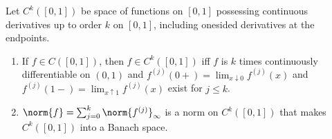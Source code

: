 \documentclass[article, a4paper, 11pt, oneside]{memoir}
\numberwithin{equation}{chapter}
\theoremstyle{nonumberplain}
\begin{document}
\begin{exerciseframed*}[9]
	Let $C^k([0,1])$ be space of functions on $[0,1]$ possessing continuous derivatives up to order $k$ on $[0,1]$, including onesided derivatives at the endpoints.
	\begin{enumerate}
		\item If $f \in C([0,1])$, then $f \in C^k([0,1])$ iff $f$ is $k$ times continuously differentiable on $(0,1)$ and $f^{(j)}(0+) = \lim_{x \downarrow 0} f^{(j)}(x)$ and $f^{(j)}(1-) = \lim_{x \uparrow 1} f^{(j)}(x)$ exist for $j \leq k$.
		\item $\norm{f} = \sum_{j=0}^k \norm{f^{(j)}}_\infty$ is a norm on $C^k([0,1])$ that makes $C^k([0,1])$ into a Banach space.
	\end{enumerate}
\end{exerciseframed*}
\end{document}
